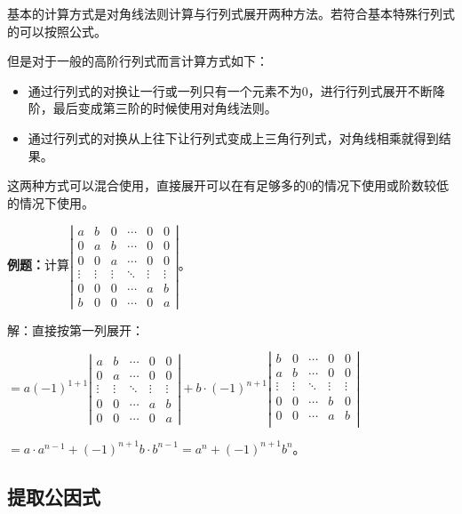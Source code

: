 基本的计算方式是对角线法则计算与行列式展开两种方法。若符合基本特殊行列式的可以按照公式。

但是对于一般的高阶行列式而言计算方式如下：

\begin{itemize}
    \item 通过行列式的对换让一行或一列只有一个元素不为0，进行行列式展开不断降阶，最后变成第三阶的时候使用对角线法则。
    \item 通过行列式的对换从上往下让行列式变成上三角行列式，对角线相乘就得到结果。
\end{itemize}

这两种方式可以混合使用，直接展开可以在有足够多的0的情况下使用或阶数较低的情况下使用。\medskip

\textbf{例题：}计算$\left|\begin{array}{cccccc} 
    a & b & 0 & \cdots & 0 & 0 \\
    0 & a & b & \cdots & 0 & 0 \\
    0 & 0 & a & \cdots & 0 & 0 \\
    \vdots & \vdots & \vdots & \ddots & \vdots & \vdots \\
    0 & 0 & 0 & \cdots & a & b \\
    b & 0 & 0 & \cdots & 0 & a
\end{array}\right|$。

解：直接按第一列展开：

$=a(-1)^{1+1}\left|\begin{array}{ccccc} 
    a & b & \cdots & 0 & 0 \\
    0 & a & \cdots & 0 & 0 \\
    \vdots & \vdots & \ddots & \vdots & \vdots \\
    0 & 0 & \cdots & a & b \\
    0 & 0 & \cdots & 0 & a
\end{array}\right|+b\cdot(-1)^{n+1}\left|\begin{array}{ccccc} 
    b & 0 & \cdots & 0 & 0 \\
    a & b & \cdots & 0 & 0 \\
    \vdots & \vdots & \ddots & \vdots & \vdots \\
    0 & 0 & \cdots & b & 0 \\
    0 & 0 & \cdots & a & b \\
\end{array}\right|$

$=a\cdot a^{n-1}+(-1)^{n+1}b\cdot b^{n-1}=a^n+(-1)^{n+1}b^n$。

\subsection{提取公因式}

